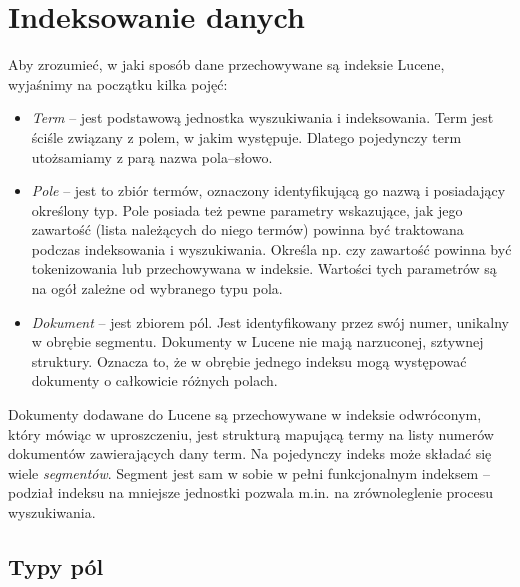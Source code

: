 \section{Indeksowanie danych}

Aby zrozumieć, w jaki sposób dane przechowywane są indeksie Lucene, wyjaśnimy na początku kilka pojęć:
\begin{itemize}
 \item \emph{Term} -- jest podstawową jednostka wyszukiwania i indeksowania. Term jest ściśle związany z polem, w jakim występuje. Dlatego pojedynczy term utożsamiamy z parą nazwa pola--słowo.
 \item \emph{Pole} -- jest to zbiór termów, oznaczony identyfikującą go nazwą i posiadający określony typ. Pole posiada też pewne parametry wskazujące, jak jego zawartość (lista należących do niego termów) powinna być traktowana podczas indeksowania i wyszukiwania. Określa np. czy zawartość powinna być tokenizowania lub przechowywana w indeksie. Wartości tych parametrów są na ogół zależne od wybranego typu pola.
 \item \emph{Dokument} -- jest zbiorem pól. Jest identyfikowany przez swój numer, unikalny w obrębie segmentu. Dokumenty w Lucene nie mają narzuconej, sztywnej struktury. Oznacza to, że w obrębie jednego indeksu mogą występować dokumenty o całkowicie różnych polach. 
\end{itemize}

Dokumenty dodawane do Lucene są przechowywane w indeksie odwróconym, który mówiąc w uproszczeniu, jest strukturą mapującą termy na listy numerów dokumentów zawierających dany term. Na pojedynczy indeks może składać się wiele \emph{segmentów}. Segment jest sam w sobie w pełni funkcjonalnym indeksem -- podział indeksu na mniejsze jednostki pozwala m.in. na zrównoleglenie procesu wyszukiwania.

\subsection{Typy pól}

